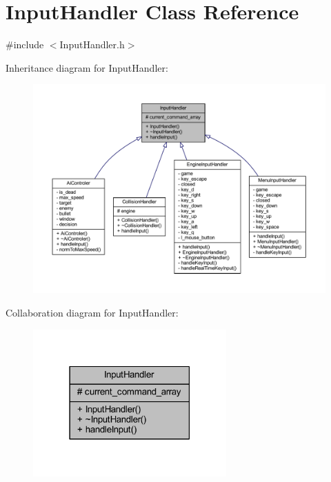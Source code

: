 \hypertarget{class_input_handler}{}\section{Input\+Handler Class Reference}
\label{class_input_handler}


{\ttfamily \#include $<$Input\+Handler.\+h$>$}



Inheritance diagram for Input\+Handler\+:
\nopagebreak
\begin{figure}[H]
\begin{center}
\leavevmode
\includegraphics[width=350pt]{class_input_handler__inherit__graph}
\end{center}
\end{figure}


Collaboration diagram for Input\+Handler\+:
\nopagebreak
\begin{figure}[H]
\begin{center}
\leavevmode
\includegraphics[width=210pt]{class_input_handler__coll__graph}
\end{center}
\end{figure}

